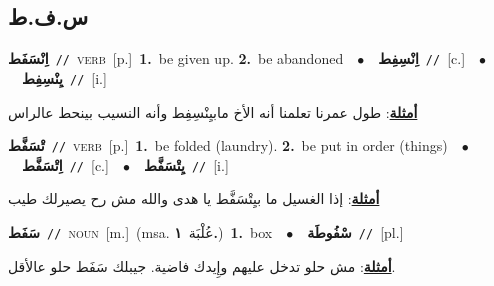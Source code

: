 \documentclass[10pt,a4paper,twoside]{article} %
\begin{document}
\begin{multicols}{2}
\vspace{-3mm}
\subsection*{\color{blue}\foreignlanguage{arabic}{س.ف.ط}\color{blue}{}} 

{\setlength\topsep{0pt}\textbf{\foreignlanguage{arabic}{اِنْسَفَط}}\ {\color{gray}\texttt{//}\color{black}}\ \textsc{verb}\ [p.]\ \textbf{1.}~be given up.  \textbf{2.}~be abandoned\ \ $\bullet$\ \ \setlength\topsep{0pt}\textbf{\foreignlanguage{arabic}{اِنْسِفِط}}\ {\color{gray}\texttt{//}\color{black}}\ [c.]\ \ $\bullet$\ \ \setlength\topsep{0pt}\textbf{\foreignlanguage{arabic}{يِنْسِفِط}}\ {\color{gray}\texttt{//}\color{black}}\ [i.]\  \begin{flushright}\color{gray}\foreignlanguage{arabic}{\textbf{\underline{\foreignlanguage{arabic}{أمثلة}}}: طول عمرنا تعلمنا أنه الأخ مابيِنْسِفِط وأنه النسيب بينحط عالراس}\end{flushright}\color{black}} \vspace{2mm}

{\setlength\topsep{0pt}\textbf{\foreignlanguage{arabic}{تْسَفَّط}}\ {\color{gray}\texttt{//}\color{black}}\ \textsc{verb}\ [p.]\ \textbf{1.}~be folded (laundry).  \textbf{2.}~be put in order (things)\ \ $\bullet$\ \ \setlength\topsep{0pt}\textbf{\foreignlanguage{arabic}{اِتْسَفَّط}}\ {\color{gray}\texttt{//}\color{black}}\ [c.]\ \ $\bullet$\ \ \setlength\topsep{0pt}\textbf{\foreignlanguage{arabic}{يِتْسَفَّط}}\ {\color{gray}\texttt{//}\color{black}}\ [i.]\  \begin{flushright}\color{gray}\foreignlanguage{arabic}{\textbf{\underline{\foreignlanguage{arabic}{أمثلة}}}: إذا الغسيل ما بيِتْسَفَّط يا هدى والله مش رح يصيرلك طيب}\end{flushright}\color{black}} \vspace{2mm}

{\setlength\topsep{0pt}\textbf{\foreignlanguage{arabic}{سَفَط}}\ {\color{gray}\texttt{//}\color{black}}\ \textsc{noun}\ [m.]\ \color{gray}(msa. \foreignlanguage{arabic}{عُلْبَة}~\foreignlanguage{arabic}{\textbf{١.}})\color{black}\ \textbf{1.}~box\ \ $\bullet$\ \ \setlength\topsep{0pt}\textbf{\foreignlanguage{arabic}{سْفُوطَة}}\ {\color{gray}\texttt{//}\color{black}}\ [pl.]\  \begin{flushright}\color{gray}\foreignlanguage{arabic}{\textbf{\underline{\foreignlanguage{arabic}{أمثلة}}}: مش حلو تدخل عليهم وإِيدك فاضية. جيبلك سَفَط حلو عالأقل.}\end{flushright}\color{black}} \vspace{2mm}


\end{multicols}
\end{document}
